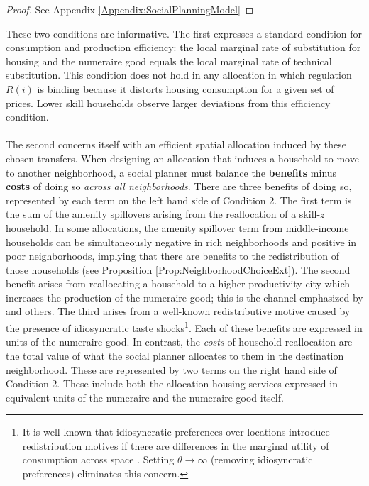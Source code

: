 \documentclass[12pt]{article}
\begin{document}
\begin{proof}
	See Appendix \ref{Appendix:SocialPlanningModel}
\end{proof}
These two conditions are informative. The first expresses a standard condition for consumption and production efficiency: the local marginal rate of substitution for housing and the numeraire good equals the local marginal rate of technical substitution. This condition does not hold in any allocation in which regulation $R(i)$ is binding because it distorts housing consumption for a given set of prices. Lower skill households observe larger deviations from this efficiency condition. 

\paragraph*{}
The second concerns itself with an efficient spatial allocation induced by these chosen transfers. When designing an allocation that induces a household to move to another neighborhood, a social planner must balance the \textbf{benefits} minus \textbf{costs} of doing so \textit{across all neighborhoods}. There are three benefits of doing so, represented by each term on the left hand side of Condition 2. The first term is the sum of the amenity spillovers arising from the reallocation of a skill-$z$ household. In some allocations, the amenity spillover term from middle-income households can be simultaneously negative in rich neighborhoods and positive in poor neighborhoods, implying that there are benefits to the redistribution of those households (see Proposition \ref{Prop:NeighborhoodChoiceExt}). The second benefit arises from reallocating a household to a higher productivity city which increases the production of the numeraire good; this is the channel emphasized by \cite{hseihmoretti} and others. The third arises from a well-known redistributive motive caused by the presence of idiosyncratic taste shocks\footnote{It is well known that idiosyncratic preferences over locations introduce redistribution motives if there are differences in the marginal utility of consumption across space \citep{efficiency, DFM}. Setting $\theta \to \infty$ (removing idiosyncratic preferences) eliminates this concern.}. Each of these benefits are expressed in units of the numeraire good. In contrast, the \textit{costs} of household reallocation are the total value of what the social planner allocates to them in the destination neighborhood. These are represented by two terms on the right hand side of Condition 2. These include both the allocation housing services expressed in equivalent units of the numeraire and the numeraire good itself.  
\end{document}
